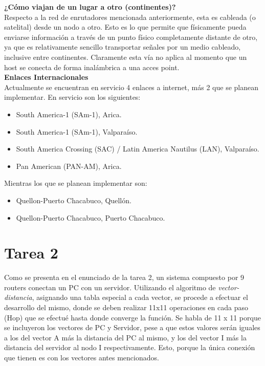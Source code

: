 \documentclass[letterpaper,10pt,onecolumn,titlepage]{article}
\begin{document}
\noindent \textbf{¿Cómo viajan de un lugar a otro (continentes)?} \\

Respecto a la red de enrutadores mencionada anteriormente, esta es cableada (o satelital) desde un nodo a otro. Esto es lo que permite que físicamente pueda enviarse información a través de un punto físico completamente distante de otro, ya que es relativamente sencillo transportar señales por un medio cableado, inclusive entre continentes. Claramente esta vía no aplica al momento que un host se conecta de forma inalámbrica a una acces point. \\

\noindent \textbf{Enlaces Internacionales} \\

Actualmente se encuentran en servicio 4 enlaces a internet, más 2 que se planean implementar. En servicio son los siguientes:

\begin{itemize}
 \item South America-1 (SAm-1), Arica.
 \item South America-1 (SAm-1), Valparaíso.
 \item South America Crossing (SAC) / Latin America Nautilus (LAN), Valparaíso.
 \item Pan American (PAN-AM), Arica.
\end{itemize}

Mientras los que se planean implementar son:

\begin{itemize}
 \item Quellon-Puerto Chacabuco, Quellón.
 \item Quellon-Puerto Chacabuco, Puerto Chacabuco.
\end{itemize}


\section{Tarea 2}

Como se presenta en el enunciado de la tarea 2, un sistema compuesto por 9 routers conectan un PC con un servidor. Utilizando el algoritmo de \textit{vector-distancia}, asignando una tabla especial a cada vector, se procede a efectuar el desarrollo del mismo, donde se deben realizar 11x11 operaciones en cada paso (Hop) que se efectué hasta donde converge la función. Se habla de 11 x 11 porque se incluyeron los vectores de PC y Servidor, pese a que estos valores serán iguales a los del vector A más la distancia del PC al mismo, y los del vector I más la distancia del servidor al nodo I respectivamente. Esto, porque la única conexión que tienen es con los vectores antes mencionados.
\end{document}

